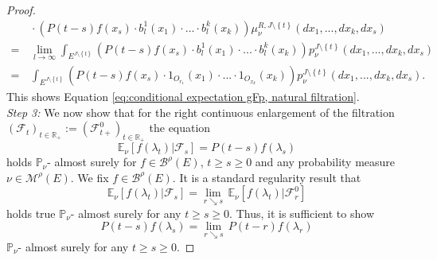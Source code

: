 \documentclass[a4paper,12pt]{article}
\theoremstyle{definition}
\theoremstyle{remark}
\numberwithin{equation}{section}
\numberwithin{theorem}{section}
\begin{document}
\begin{proof}
\begin{align*}
 & \,\cdot\left(P\left(t-s\right)f(x_s)\cdot b_{l}^{1}\left(x_{1}\right)\cdot...\cdot b_{l}^{k}\left(x_{k}\right)\right)\mu_{\nu}^{R,J\setminus\left\{ t\right\} }(dx_{1},...,dx_{k},dx_{s})\\
 =& \,\underset{l\rightarrow\infty}{\lim}\int_{E^{J\setminus\left\{ t\right\} }}\left(P\left(t-s\right)f(x_s)\cdot b_{l}^{1}\left(x_{1}\right)\cdot...\cdot b_{l}^{k}\left(x_{k}\right)\right)p_{\nu}^{J\setminus\left\{ t\right\} }(dx_{1},...,dx_{k},dx_{s})\\
 =&\, \int_{E^{J\setminus\left\{ t\right\} }}\left(P\left(t-s\right)f(x_s)\cdot1_{O_{r_{1}}}\left(x_{1}\right)\cdot...\cdot1_{O_{x_{k}}}\left(x_{k}\right)\right)p_{\nu}^{J\setminus\left\{ t\right\} }(dx_{1},...,dx_{k},dx_{s}).
\end{align*}
This shows Equation \eqref{eq:conditional expectation gFp, natural filtration}.
\\

\emph{Step 3:} We now show that for the right continuous
enlargement of the filtration
$
\left(\mathcal{F}_{t}\right)_{t\in\mathbb{R}_{+}}:=\left(\mathcal{F}_{t+}^{0}\right)_{t\in\mathbb{R}_{+}}
$
the equation
\[
\mathbb{E}_{\nu}\left[\left.f(\lambda_{t})\right|\mathcal{F}_{s}\right]=P\left(t-s\right)f(\lambda_{s})
\]
holds $\mathbb{P}_{\nu}$- almost surely for $f\in\mathcal{\mathscr{B}}^{\rho}(E)$, $t\geq s\geq0$ and any  probability measure  $\nu\in\mathcal{M}^{\rho}(E)$.  We fix
 $f\in\mathcal{\mathscr{B}}^{\rho}(E)$. It is a standard regularity result that
\begin{equation}
\mathbb{E}_{\nu}\left[\left.f(\lambda_{t})\right|\mathcal{F}_{s}\right]=\underset{r\searrow s}{\lim}\,\mathbb{E}_{\nu}\left[\left.f(\lambda_{t})\right|\mathcal{F}_{r}^{0}\right]\label{eq:proof GFS is Markov process, equation right continuous enlargement}
\end{equation}
holds true $\mathbb{P}_{\nu}$- almost surely for any $t\geq s\geq0$.
Thus, it is sufficient to show 
\[
P\left(t-s\right)f(\lambda_{s})=\underset{r\searrow s}{\lim}\,P\left(t-r\right)f(\lambda_{r})
\]
 $\mathbb{P}_{\nu}$- almost surely for any $t\geq s\geq0$. 
 

\end{proof}
\end{document}

